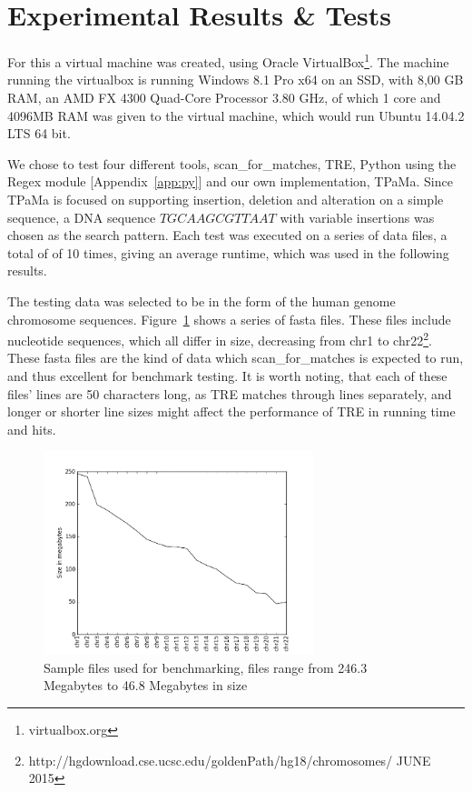 \section{Experimental Results \& Tests}
For this a virtual machine was created, using Oracle VirtualBox\footnote{virtualbox.org}. The machine running the virtualbox is running Windows 8.1 Pro x64 on an SSD, with 8,00 GB RAM, an AMD FX 4300 Quad-Core Processor 3.80 GHz, of which 1 core and 4096MB RAM was given to the virtual machine, which would run Ubuntu 14.04.2 LTS 64 bit.

We chose to test four different tools, scan\_for\_matches, TRE, Python using the Regex module [Appendix~\ref{app:py}] and our own implementation, TPaMa. Since TPaMa is focused on supporting insertion, deletion and alteration on a simple sequence, a DNA sequence $TGCAAGCGTTAAT$ with variable insertions was chosen as the search pattern. Each test was executed on a series of data files, a total of of 10 times, giving an average runtime, which was used in the following results.


The testing data was selected to be in the form of the human genome chromosome sequences. Figure~\ref{fig:size} shows a series of fasta files. These files include nucleotide sequences, which all differ in size, decreasing from chr1 to chr22\footnote{http://hgdownload.cse.ucsc.edu/goldenPath/hg18/chromosomes/ JUNE 2015}. These fasta files are the kind of data which scan\_for\_matches is expected to run, and thus excellent for benchmark testing. It is worth noting, that each of these files' lines are 50 characters long, as TRE matches through lines separately, and longer or shorter line sizes might affect the performance of TRE in running time and hits.%
\begin{figure}[h!]
\centering
\includegraphics[width=0.7\textwidth]{Benchmarking/size.png}
\caption{Sample files used for benchmarking, files range from 246.3 Megabytes to 46.8 Megabytes in size}
\label{fig:size}
\end{figure}

